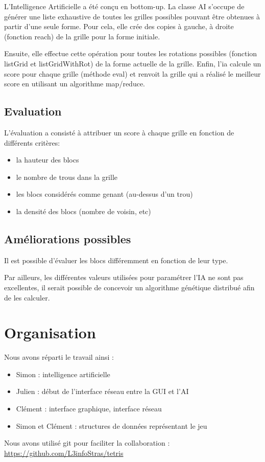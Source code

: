\documentclass[11pt]{article}
\begin{document}
L'Intelligence Artificielle a été conçu en bottom-up.  La classe AI
s'occupe de générer une liste exhaustive de toutes les grilles
possibles pouvant être obtenues à partir d'une seule forme.  Pour
cela, elle crée des copies à gauche, à droite (fonction reach) de la
grille pour la forme initiale.

Ensuite, elle effectue cette opération pour toutes les rotations
possibles (fonction listGrid et listGridWithRot) de la forme actuelle
de la grille.  Enfin, l'ia calcule un score pour chaque grille
(méthode eval) et renvoit la grille qui a réalisé le meilleur score en
utilisant un algorithme map/reduce.

\subsection{Evaluation}

L'évaluation a consisté à attribuer un score à chaque grille en fonction
de différents critères:

\begin{itemize}
 \item la hauteur des blocs 
 \item le nombre de trous dans la grille
 \item les blocs considérés comme genant (au-dessus d'un trou)
 \item la densité des blocs (nombre de voisin, etc)
\end{itemize}

\subsection{Améliorations possibles}

Il est possible d'évaluer les blocs différemment en fonction de leur
type.

Par ailleurs, les différentes valeurs utilisées pour paramétrer l'IA
ne sont pas excellentes, il serait possible de concevoir un algorithme
génétique distribué afin de les calculer.

\section{Organisation}
\label{sec-5}

Nous avons réparti le travail ainsi :

\begin{itemize}
  \item Simon : intelligence artificielle
  \item Julien : début de l'interface réseau entre la GUI et l'AI
  \item Clément : interface graphique, interface réseau 
  \item Simon et Clément : structures de données représentant le jeu

\end{itemize}

Nous avons utilisé git pour faciliter la collaboration : \url{https://github.com/L3infoStras/tetris}

\end{document}
